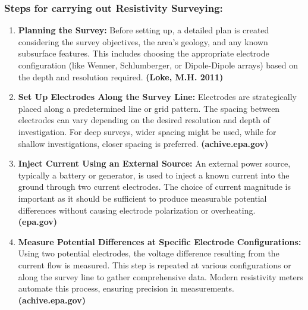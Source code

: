 \documentclass[12pt,a4paper]{report}
\begin{document}
\subsubsection{Steps for carrying out Resistivity Surveying:}
\begin{enumerate}
    \item \textbf{Planning the Survey:} Before setting up, a detailed plan is created considering the survey objectives, the area's geology, and any known subsurface features. This includes choosing the appropriate electrode configuration (like Wenner, Schlumberger, or Dipole-Dipole arrays) based on the depth and resolution required. \textbf{(Loke, M.H. 2011)}

    \item \textbf{Set Up Electrodes Along the Survey Line:} Electrodes are strategically placed along a predetermined line or grid pattern. The spacing between electrodes can vary depending on the desired resolution and depth of investigation. For deep surveys, wider spacing might be used, while for shallow investigations, closer spacing is preferred. \textbf{(achive.epa.gov)}

    \item \textbf{Inject Current Using an External Source:} An external power source, typically a battery or generator, is used to inject a known current into the ground through two current electrodes. The choice of current magnitude is important as it should be sufficient to produce measurable potential differences without causing electrode polarization or overheating. \\ \textbf{(epa.gov)}

    \item \textbf{Measure Potential Differences at Specific Electrode Configurations:} Using two potential electrodes, the voltage difference resulting from the current flow is measured. This step is repeated at various configurations or along the survey line to gather comprehensive data. Modern resistivity meters automate this process, ensuring precision in measurements. \textbf{(achive.epa.gov)}


\end{enumerate}
\end{document}
